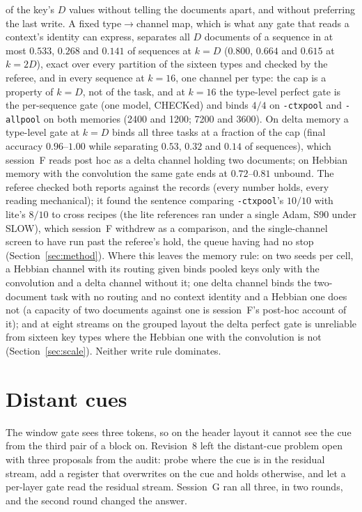 \documentclass[11pt]{article}
\begin{document}
of the key's $D$ values without telling the documents apart, and without preferring the last write. A fixed type$\to$channel map, which is what any gate that reads a context's identity can express, separates all $D$ documents of a sequence in at most $0.533$, $0.268$ and $0.141$ of sequences at $k = D$ ($0.800$, $0.664$ and $0.615$ at $k = 2D$), exact over every partition of the sixteen types and checked by the referee, and in every sequence at $k = 16$, one channel per type: the cap is a property of $k = D$, not of the task, and at $k = 16$ the type-level perfect gate is the per-sequence gate (one model, CHECKed) and binds $4/4$ on \texttt{-ctxpool} and \texttt{-allpool} on both memories (2400 and 1200; 7200 and 3600). On delta memory a type-level gate at $k = D$ binds all three tasks at a fraction of the cap (final accuracy $0.96$--$1.00$ while separating $0.53$, $0.32$ and $0.14$ of sequences), which session~F reads post hoc as a delta channel holding two documents; on Hebbian memory with the convolution the same gate ends at $0.72$--$0.81$ unbound. The referee checked both reports against the records (every number holds, every reading mechanical); it found the sentence comparing \texttt{-ctxpool}'s $10/10$ with lite's $8/10$ to cross recipes (the lite references ran under a single Adam, S90 under SLOW), which session~F withdrew as a comparison, and the single-channel screen to have run past the referee's hold, the queue having had no stop (Section~\ref{sec:method}). Where this leaves the memory rule: on two seeds per cell, a Hebbian channel with its routing given binds pooled keys only with the convolution and a delta channel without it; one delta channel binds the two-document task with no routing and no context identity and a Hebbian one does not (a capacity of two documents against one is session~F's post-hoc account of it); and at eight streams on the grouped layout the delta perfect gate is unreliable from sixteen key types where the Hebbian one with the convolution is not (Section~\ref{sec:scale}). Neither write rule dominates.

\section{Distant cues}
\label{sec:far}

The window gate sees three tokens, so on the header layout it cannot see the cue from the third pair of a block on. Revision~8 left the distant-cue problem open with three proposals from the audit: probe where the cue is in the residual stream, add a register that overwrites on the cue and holds otherwise, and let a per-layer gate read the residual stream. Session~G ran all three, in two rounds, and the second round changed the answer.
\end{document}
